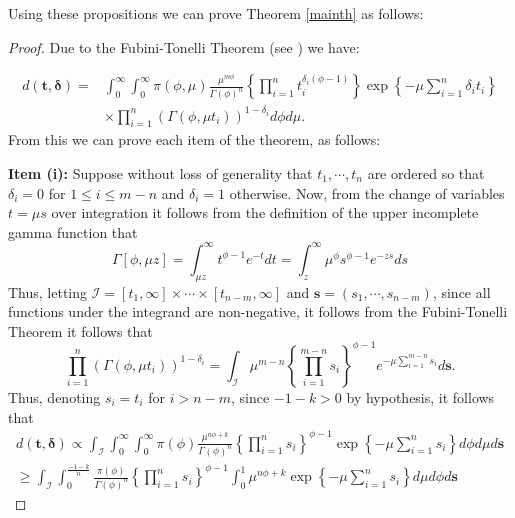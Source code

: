 \documentclass[12pt]{article} %
\theoremstyle{plain}%
\theoremstyle{definition}
\theoremstyle{remark}
\begin{document}
Using these propositions we can prove Theorem \ref{mainth} as follows:

\begin{proof} Due to the Fubini-Tonelli Theorem (see \cite{folland}) we have:

\begin{align*}%
d(\boldsymbol{t,\delta})=&\int_{0}^{\infty}\int_{0}^{\infty}\pi(\phi,\mu)\frac{\mu^{m\phi}}{\Gamma(\phi)^n}\left\{\prod_{i=1}^n{t_i^{\delta_i(\phi-1)}}\right\}\exp\left\{-\mu\sum_{i=1}^n {\delta_i}t_i\right\}\nonumber \\
&\times \prod_{i=1}^n\left(\Gamma(\phi,\mu t_i)\right)^{1-\delta_i}d\phi d\mu.
\end{align*}
From this we can prove each item of the theorem, as follows:

\vspace{0.3cm}
\noindent \textbf{Item (i):} Suppose without loss of generality that $t_1,\cdots,t_n$ are ordered so that $\delta_i=0$ for $1\leq i\leq m-n$ and $\delta_i=1$ otherwise. Now, from the change of variables $t=\mu s$ over integration it follows from the definition of the upper incomplete gamma function that
\begin{equation*}\Gamma[\phi,\mu z] =\int_{\mu z}^\infty t^{\phi-1} e^{-t}  dt =  \int_z^\infty \mu^\phi s^{\phi-1} e^{-zs} ds
\end{equation*}
Thus, letting $\mathcal{I}=[t_1,\infty]\times \cdots \times [t_{n-m},\infty]$ and $\boldsymbol{s} = (s_1,\cdots,s_{n-m})$, since all functions under the integrand are non-negative, it follows from the Fubini-Tonelli Theorem it follows that
\begin{equation*} \prod_{i=1}^n\left(\Gamma(\phi,\mu t_i)\right)^{1-\delta_i} = \int_{\mathcal{I}} \mu^{m-n} \left\{\prod_{i=1}^{m-n} s_i \right\}^{\phi-1}e^{-\mu \sum_{i=1}^{m-n} s_i}d\boldsymbol{s}.
\end{equation*}
Thus, denoting $s_i = t_i$ for $i>n-m$, since $-1-k>0$ by hypothesis, it follows that 
 \begin{equation}
 \begin{aligned}
 \label{posteriord2}
d(\boldsymbol{t,\delta})\propto \int_{\mathcal{I}} \int_{0}^{\infty}\int_{0}^{\infty}\pi(\phi)\frac{\mu^{n\phi+k}}{\Gamma(\phi)^n}\left\{\prod_{i=1}^n{s_i}\right\}^{\phi-1}\exp\left\{-\mu\sum_{i=1}^n s_i\right\}d\phi d\mu d\boldsymbol{s} \\
\geq \int_{\mathcal{I}} \int_{0}^{\frac{-1-k}{n}}\frac{\pi(\phi)}{\Gamma(\phi)^n}\left\{\prod_{i=1}^n{s_i}\right\}^{\phi-1}\int_{0}^{1}\mu^{n\phi+k}\exp\left\{-\mu\sum_{i=1}^n s_i\right\}d\mu d\phi d\boldsymbol{s}

\end{aligned}
\end{equation}
\end{proof}
\end{document}
